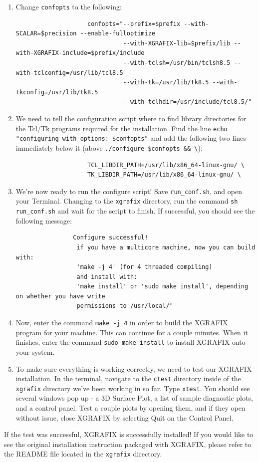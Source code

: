 \documentclass{article}
\begin{document}
\begin{enumerate}
		\item Change \verb|confopts| to the following:
		\begin{verbatim}
			        confopts="--prefix=$prefix --with-SCALAR=$precision --enable-fulloptimize
			                  --with-XGRAFIX-lib=$prefix/lib --with-XGRAFIX-include=$prefix/include
			                  --with-tclsh=/usr/bin/tclsh8.5 --with-tclconfig=/usr/lib/tcl8.5
			                  --with-tk=/usr/lib/tk8.5 --with-tkconfig=/usr/lib/tk8.5
			                  --with-tclhdir=/usr/include/tcl8.5/"
		\end{verbatim}
		
		\item We need to tell the configuration script where to find library directories for the Tcl/Tk programs required for the installation. Find the line \verb|echo "configuring with options: $confopts"| and add the following two lines immediately below it (above \verb|./configure $confopts && \|):
		\begin{verbatim}
		            TCL_LIBDIR_PATH=/usr/lib/x86_64-linux-gnu/ \
		            TK_LIBDIR_PATH=/usr/lib/x86_64-linux-gnu/ \
		\end{verbatim}
		
		\item We're now ready to run the configure script! Save \verb|run_conf.sh|, and open your Terminal. Changing to the \verb|xgrafix| directory, run the command \verb|sh run_conf.sh| and wait for the script to finish. If successful, you should see the following message: 
		\begin{verbatim}
		        Configure successful!
		         if you have a multicore machine, now you can build with:
		         'make -j 4' (for 4 threaded compiling)
		         and install with:
		         'make install' or 'sudo make install', depending on whether you have write
		         permissions to /usr/local/"
		\end{verbatim}
		
		\item Now, enter the command \verb|make -j 4| in order to build the XGRAFIX program for your machine. This can continue for a couple minutes. When it finishes, enter the command \verb|sudo make install| to install XGRAFIX onto your system. 
		
		\item To make sure everything is working correctly, we need to test our XGRAFIX installation. In the terminal, navigate to the \verb|ctest| directory inside of the \verb|xgrafix| directory we've been working in so far. Type \verb|xtest|. You should see several windows pop up - a 3D Surface Plot, a list of sample diagnostic plots, and a control panel. Test a couple plots by opening them, and if they open without issue, close XGRAFIX by selecting Quit on the Control Panel. 
	\end{enumerate}
	\noindent If the test was successful, XGRAFIX is successfully installed! If you would like to see the original installation instruction packaged with XGRAFIX, please refer to the README file located in the \verb|xgrafix| directory.
	
\end{document}
